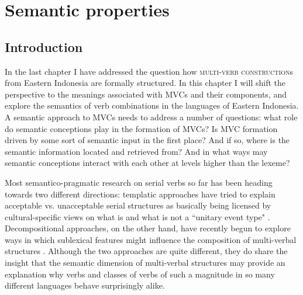 \chapter{Semantic properties} \label{ch:sem}
\section{Introduction}
In the last chapter I have addressed the question how \textsc{multi-verb construction}s from Eastern Indonesia are formally structured. In this chapter I will shift the perspective to the meanings associated with MVCs and their components, and explore the semantics of verb combinations in the languages of Eastern Indonesia. A semantic approach to MVCs needs to address a number of questions: what role do semantic conceptions play in the formation of MVCs? Is MVC formation driven by some sort of semantic input in the first place? And if so, where is the semantic information located and retrieved from? And in what ways may semantic conceptions interact with each other at levels higher than the lexeme? 

Most semantico-pragmatic research on serial verbs so far has been heading towards two different directions: templatic approaches have tried to explain acceptable vs. unacceptable serial structures as basically being licensed by cultural-specific views on what is and what is not a ``unitary event type" \citep{bruce1988, pawley1991saying, pawley2011event, Durie1997}. Decompositional approaches, on the other hand, have recently begun to explore ways in which sublexical features might influence the composition of multi-verbal structures \citep{baker2010complex, foley2010events}. Although the two approaches are quite different, they do share the insight that the semantic dimension of multi-verbal structures may provide an explanation why verbs and classes of verbs of such a magnitude in so many different languages behave surprisingly alike.

